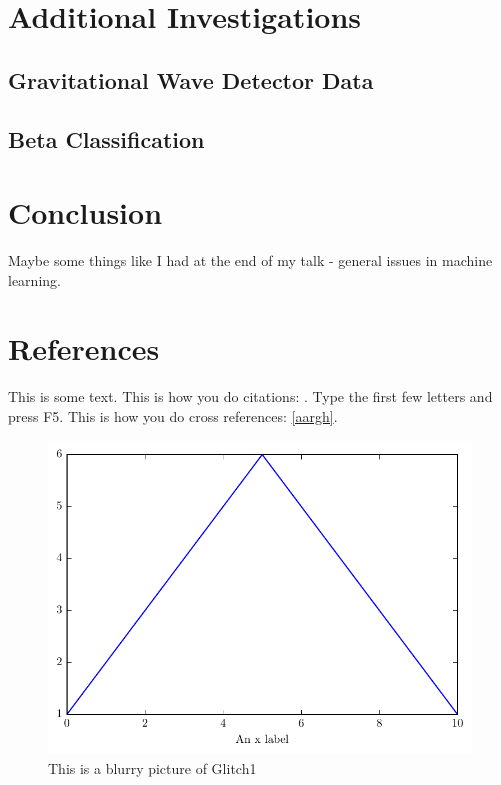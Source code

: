 \documentclass[a4paper]{jpconf}
\begin{document}
\section{Additional Investigations}%
\subsection{Gravitational Wave Detector Data}%
\subsection{Beta Classification}%

\section{Conclusion}%
Maybe some things like I had at the end of my talk - general issues in machine learning.
\section*{References} %
This is some text. This is how you do citations: \cite{}. Type the first few letters and press F5.
This is how you do cross references: \ref{aargh}.

\begin{center}
\begin{figure}
\begin{minipage}{40pc}
\includegraphics[width=40pc]{testMatplotlibPlot.pdf}
\caption{This is a blurry picture of Glitch1}
\end{minipage}
\end{figure}
\end{center}
\end{document}
